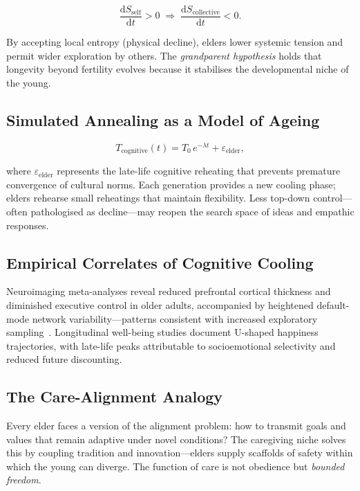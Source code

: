 \documentclass[12pt,a4paper]{article}
\theoremstyle{definition}
\newcommand{\ddt}[1]{\frac{\mathrm{d}#1}{\mathrm{d}t}}
\begin{document}
\begin{equation}
  \ddt{S_{\mathrm{self}}} > 0
  \;\Longrightarrow\;
  \ddt{S_{\mathrm{collective}}} < 0.
\end{equation}

By accepting local entropy (physical decline), elders lower systemic tension
and permit wider exploration by others.  The \emph{grandparent hypothesis}
holds that longevity beyond fertility evolves because it stabilises the
developmental niche of the young.

\subsection{Simulated Annealing as a Model of Ageing}

\begin{equation}
  T_{\mathrm{cognitive}}(t)
  = T_0\,e^{-\lambda t} + \varepsilon_{\mathrm{elder}},
\end{equation}

where $\varepsilon_{\mathrm{elder}}$ represents the late-life cognitive
reheating that prevents premature convergence of cultural norms.  Each
generation provides a new cooling phase; elders rehearse small reheatings
that maintain flexibility.  Less top-down control---often pathologised as
decline---may reopen the search space of ideas and empathic responses.

\subsection{Empirical Correlates of Cognitive Cooling}

Neuroimaging meta-analyses reveal reduced prefrontal cortical thickness and
diminished executive control in older adults, accompanied by heightened
default-mode network variability---patterns consistent with increased
exploratory sampling~\citep{carstensen2011}.  Longitudinal well-being studies
document U-shaped happiness trajectories, with late-life peaks attributable to
socioemotional selectivity and reduced future discounting.

\subsection{The Care-Alignment Analogy}

Every elder faces a version of the alignment problem: how to transmit goals
and values that remain adaptive under novel conditions?  The caregiving niche
solves this by coupling tradition and innovation---elders supply scaffolds of
safety within which the young can diverge.  The function of care is not
obedience but \emph{bounded freedom}.
\end{document}
